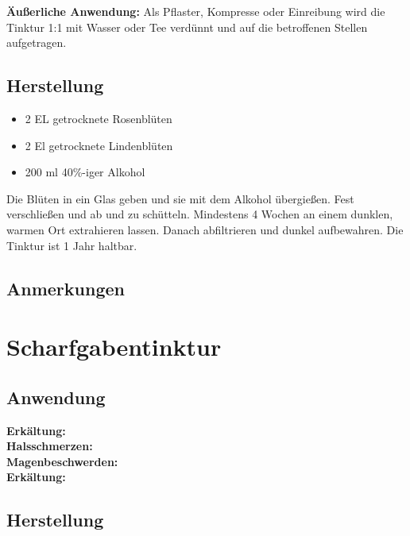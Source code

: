 \textbf{Äußerliche Anwendung:} Als Pflaster, Kompresse oder Einreibung wird die Tinktur 1:1 mit Wasser oder Tee verdünnt und auf die betroffenen Stellen aufgetragen.\\

\subsection{Herstellung}

\begin{itemize}
	\item 2 EL getrocknete Rosenblüten
	\item 2 El getrocknete Lindenblüten
	\item 200 ml 40\%-iger Alkohol
\end{itemize}

Die Blüten in ein Glas geben und sie mit dem Alkohol übergießen. Fest verschließen und ab und zu schütteln. Mindestens 4 Wochen an einem dunklen, warmen Ort extrahieren lassen. Danach abfiltrieren und dunkel aufbewahren. Die Tinktur ist 1 Jahr haltbar.

\subsection{Anmerkungen}


\newpage


\section{Scharfgabentinktur}


   

\subsection{Anwendung}
\textbf{Erkältung:} \\ 

\textbf{Halsschmerzen:} \\ 

\textbf{Magenbeschwerden:} \\ 

\textbf{Erkältung:} \\ 

\subsection{Herstellung}
